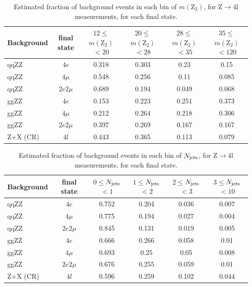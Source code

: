 \begin{table}[!h!tb]  
\begin{center}  
\small  
    \caption{  
        Estimated fraction of background events in each bin of $m(\mathrm{Z}_{2})$, for Z$\to$4l measurements, for each final state.  
\label{tab:z4l_fractions_massZ2}  
}  
\begin{tabular}{|l|c|c|c|c|c|}  
\hline  
Background & final state & $12\leq$$m(\mathrm{Z}_{2})$$<20$ & $20\leq$$m(\mathrm{Z}_{2})$$<28$ & $28\leq$$m(\mathrm{Z}_{2})$$<35$ & $35\leq$$m(\mathrm{Z}_{2})$$<120$ \\ \hline  
qqZZ& $4e$  & 0.318 & 0.303 & 0.23 & 0.15  \\
qqZZ& $4\mu$  & 0.548 & 0.256 & 0.11 & 0.085  \\
qqZZ& $2e2\mu$  & 0.689 & 0.194 & 0.049 & 0.068  \\
ggZZ& $4e$  & 0.153 & 0.223 & 0.251 & 0.373  \\
ggZZ& $4\mu$  & 0.212 & 0.264 & 0.218 & 0.306  \\
ggZZ& $2e2\mu$  & 0.397 & 0.269 & 0.167 & 0.167  \\
Z+X (CR)& $4l$  & 0.443 & 0.365 & 0.113 & 0.079  \\
\hline  
\end{tabular}  
\normalsize  
\end{center}  
\end{table}  

\begin{table}[!h!tb]  
\begin{center}  
\small  
    \caption{  
        Estimated fraction of background events in each bin of $N_{\rm jets}$, for Z$\to$4l measurements, for each final state.  
\label{tab:z4l_fractions_njets_reco_pt30_eta4p7}  
}  
\begin{tabular}{|l|c|c|c|c|c|}  
\hline  
Background & final state & $0\leq$$N_{\rm jets}$$<1$ & $1\leq$$N_{\rm jets}$$<2$ & $2\leq$$N_{\rm jets}$$<3$ & $3\leq$$N_{\rm jets}$$<10$ \\ \hline  
qqZZ& $4e$  & 0.752 & 0.204 & 0.036 & 0.007  \\
qqZZ& $4\mu$  & 0.775 & 0.194 & 0.027 & 0.004  \\
qqZZ& $2e2\mu$  & 0.845 & 0.131 & 0.019 & 0.005  \\
ggZZ& $4e$  & 0.666 & 0.266 & 0.058 & 0.01  \\
ggZZ& $4\mu$  & 0.693 & 0.25 & 0.05 & 0.008  \\
ggZZ& $2e2\mu$  & 0.676 & 0.255 & 0.059 & 0.01  \\
Z+X (CR)& $4l$  & 0.596 & 0.259 & 0.102 & 0.044  \\
\hline  
\end{tabular}  
\normalsize  
\end{center}  
\end{table}  

